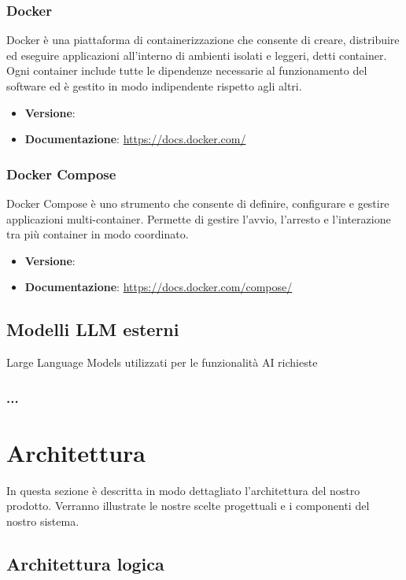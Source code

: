 \documentclass[a4paper,10pt]{article}
\begin{document}
\subsubsection{Docker}
Docker è una piattaforma di containerizzazione che consente di creare, distribuire ed eseguire applicazioni all’interno di ambienti isolati e leggeri, detti container. Ogni container include tutte le dipendenze necessarie al funzionamento del software ed è gestito in modo indipendente rispetto agli altri.
\begin{itemize}
    \item \textbf{Versione}:
    \item \textbf{Documentazione}: \url{https://docs.docker.com/}
\end{itemize}

\subsubsection{Docker Compose}
Docker Compose è uno strumento che consente di definire, configurare e gestire applicazioni multi-container. Permette di gestire l’avvio, l’arresto e l’interazione tra più container in modo coordinato.
\begin{itemize}
    \item \textbf{Versione}:
    \item \textbf{Documentazione}: \url{https://docs.docker.com/compose/}
\end{itemize}

\subsection{Modelli LLM esterni}
Large Language Models utilizzati per le funzionalità AI richieste

\subsubsection{...}

\newpage

\section{Architettura}
In questa sezione è descritta in modo dettagliato l'architettura del nostro prodotto. Verranno illustrate le nostre scelte progettuali e i componenti del nostro sistema.

\subsection{Architettura logica}
\end{document}
